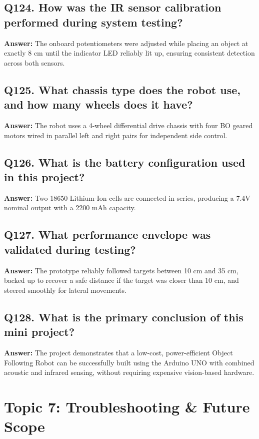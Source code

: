 \documentclass[12pt,a4paper,oneside]{report}
\begin{document}
\section{Q124. How was the IR sensor calibration performed during system testing?}
\textbf{Answer:} The onboard potentiometers were adjusted while placing an object at exactly 8 cm until the indicator LED reliably lit up, ensuring consistent detection across both sensors.

\section{Q125. What chassis type does the robot use, and how many wheels does it have?}
\textbf{Answer:} The robot uses a 4-wheel differential drive chassis with four BO geared motors wired in parallel left and right pairs for independent side control.

\section{Q126. What is the battery configuration used in this project?}
\textbf{Answer:} Two 18650 Lithium-Ion cells are connected in series, producing a 7.4V nominal output with a 2200 mAh capacity.

\section{Q127. What performance envelope was validated during testing?}
\textbf{Answer:} The prototype reliably followed targets between 10 cm and 35 cm, backed up to recover a safe distance if the target was closer than 10 cm, and steered smoothly for lateral movements.

\section{Q128. What is the primary conclusion of this mini project?}
\textbf{Answer:} The project demonstrates that a low-cost, power-efficient Object Following Robot can be successfully built using the Arduino UNO with combined acoustic and infrared sensing, without requiring expensive vision-based hardware.

\chapter{Topic 7: Troubleshooting \& Future Scope}
\end{document}
